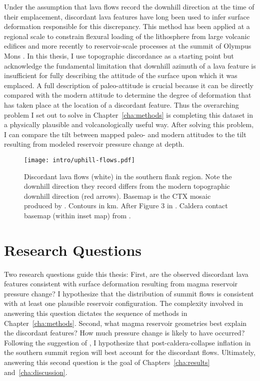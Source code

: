 Under the assumption that lava flows record the downhill direction at the time of their emplacement, discordant lava features have long been used to infer surface deformation responsible for this discrepancy. This method has been applied at a regional scale to constrain flexural loading of the lithosphere from large volcanic edifices \parencite{mouginis-mark_ancient_1982,isherwood_volcanic_2013,chadwick_late_2015} and more recently to reservoir-scale processes at the summit of Olympus Mons \parencite{mouginis-mark_late-stage_2019}. In this thesis, I use topographic discordance as a starting point but acknowledge the fundamental limitation that downhill azimuth of a lava feature is insufficient for fully describing the attitude of the surface upon which it was emplaced. A full description of paleo-attitude is crucial because it can be directly compared with the modern attitude to determine the degree of deformation that has taken place at the location of a discordant feature. Thus the overarching problem I set out to solve in Chapter~\ref{cha:methods} is completing this dataset in a physically plausible and volcanologically useful way. After solving this problem, I can compare the tilt between mapped paleo- and modern attitudes to the tilt resulting from modeled reservoir pressure change at depth.

\begin{figure}
    \centering
    \texttt{[image: intro/uphill-flows.pdf]}
    \caption[Discordant lava flows]{Discordant lava flows (white) in the southern flank region. Note the downhill direction they record differs from the modern topographic downhill direction (red arrows). Basemap is the \acf{CTX} mosaic produced by \textcite{Dickson2018AGB}. Contours in \unit{\km}. After Figure 3 in \textcite{mouginis-mark_late-stage_2019}. Caldera contact basemap (within inset map) from \textcite{mouginis-mark_geologic_2021}.}%
    \label{fig:uphill-flows}
\end{figure}

\section{Research Questions}\label{sec:research-questions}
Two research questions guide this thesis: First, are the observed discordant lava features consistent with surface deformation resulting from magma reservoir pressure change? I hypothesize that the distribution of summit flows is consistent with at least one plausible reservoir configuration. The complexity involved in answering this question dictates the sequence of methods in Chapter~\ref{cha:methods}. Second, what magma reservoir geometries best explain the discordant features? How much pressure change is likely to have occurred? Following the suggestion of \textcite{mouginis-mark_late-stage_2019}, I hypothesize that post-caldera-collapse inflation in the southern summit region will best account for the discordant flows. Ultimately, answering this second question is the goal of Chapters~\ref{cha:results} and~\ref{cha:discussion}. 